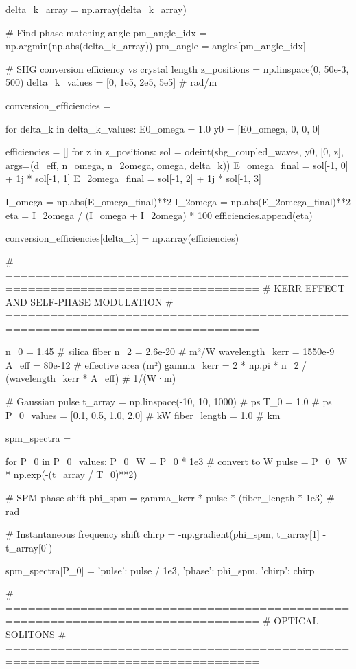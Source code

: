 \documentclass[a4paper, 11pt]{article}
\begin{document}
\begin{pycode}
delta_k_array = np.array(delta_k_array)

# Find phase-matching angle
pm_angle_idx = np.argmin(np.abs(delta_k_array))
pm_angle = angles[pm_angle_idx]

# SHG conversion efficiency vs crystal length
z_positions = np.linspace(0, 50e-3, 500)
delta_k_values = [0, 1e5, 2e5, 5e5]  # rad/m

conversion_efficiencies = {}

for delta_k in delta_k_values:
    E0_omega = 1.0
    y0 = [E0_omega, 0, 0, 0]

    efficiencies = []
    for z in z_positions:
        sol = odeint(shg_coupled_waves, y0, [0, z],
                    args=(d_eff, n_omega, n_2omega, omega, delta_k))
        E_omega_final = sol[-1, 0] + 1j * sol[-1, 1]
        E_2omega_final = sol[-1, 2] + 1j * sol[-1, 3]

        I_omega = np.abs(E_omega_final)**2
        I_2omega = np.abs(E_2omega_final)**2
        eta = I_2omega / (I_omega + I_2omega) * 100
        efficiencies.append(eta)

    conversion_efficiencies[delta_k] = np.array(efficiencies)

# ================================================================================
# KERR EFFECT AND SELF-PHASE MODULATION
# ================================================================================

n_0 = 1.45  # silica fiber
n_2 = 2.6e-20  # m²/W
wavelength_kerr = 1550e-9
A_eff = 80e-12  # effective area (m²)
gamma_kerr = 2 * np.pi * n_2 / (wavelength_kerr * A_eff)  # 1/(W·m)

# Gaussian pulse
t_array = np.linspace(-10, 10, 1000)  # ps
T_0 = 1.0  # ps
P_0_values = [0.1, 0.5, 1.0, 2.0]  # kW
fiber_length = 1.0  # km

spm_spectra = {}

for P_0 in P_0_values:
    P_0_W = P_0 * 1e3  # convert to W
    pulse = P_0_W * np.exp(-(t_array / T_0)**2)

    # SPM phase shift
    phi_spm = gamma_kerr * pulse * (fiber_length * 1e3)  # rad

    # Instantaneous frequency shift
    chirp = -np.gradient(phi_spm, t_array[1] - t_array[0])

    spm_spectra[P_0] = {'pulse': pulse / 1e3, 'phase': phi_spm, 'chirp': chirp}

# ================================================================================
# OPTICAL SOLITONS
# ================================================================================


\end{pycode}
\end{document}
